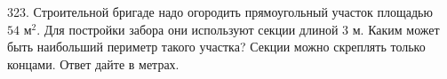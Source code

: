 323. Строительной бригаде надо огородить прямоугольный участок площадью $54\text{ м}^2.$ Для постройки забора они используют секции длиной 3 м. Каким может быть
наибольший периметр такого участка? Секции можно скреплять только концами. Ответ дайте в метрах.\\
